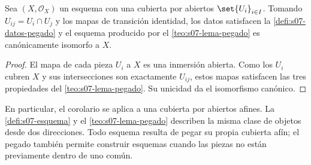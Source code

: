\begin{coro}
\label{coro:s07-x-esquema-cubierta-abiertos-u}
Sea $(X,\mathcal O_X)$ un esquema con una cubierta por abiertos $\set{U_i}_{i\in I}$. Tomando $U_{ij}=U_i\cap U_j$ y los mapas de transición identidad, los datos satisfacen la \cref{defi:s07-datos-pegado} y el esquema producido por el \cref{teo:s07-lema-pegado} es canónicamente isomorfo a $X$.
\end{coro}
\begin{proof}
El mapa de cada pieza $U_i$ a $X$ es una inmersión abierta. Como los $U_i$ cubren $X$ y sus intersecciones son exactamente $U_{ij}$, estos mapas satisfacen las tres propiedades del \cref{teo:s07-lema-pegado}. Su unicidad da el isomorfismo canónico.
\end{proof}
\begin{obs}
\label{obs:s07-definicion-esquema-cubiertas-afines-teorema}
En particular, el corolario se aplica a una cubierta por abiertos afines. La \cref{defi:s07-esquema} y el \cref{teo:s07-lema-pegado} describen la misma clase de objetos desde dos direcciones. Todo esquema resulta de pegar su propia cubierta afín; el pegado también permite construir esquemas cuando las piezas no están previamente dentro de uno común.
\end{obs}

